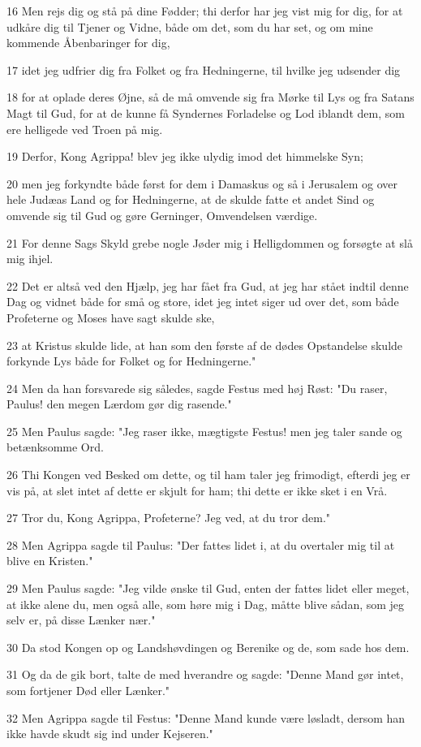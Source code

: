 \par 16 Men rejs dig og stå på dine Fødder; thi derfor har jeg vist mig for dig, for at udkåre dig til Tjener og Vidne, både om det, som du har set, og om mine kommende Åbenbaringer for dig,
\par 17 idet jeg udfrier dig fra Folket og fra Hedningerne, til hvilke jeg udsender dig
\par 18 for at oplade deres Øjne, så de må omvende sig fra Mørke til Lys og fra Satans Magt til Gud, for at de kunne få Syndernes Forladelse og Lod iblandt dem, som ere helligede ved Troen på mig.
\par 19 Derfor, Kong Agrippa! blev jeg ikke ulydig imod det himmelske Syn;
\par 20 men jeg forkyndte både først for dem i Damaskus og så i Jerusalem og over hele Judæas Land og for Hedningerne, at de skulde fatte et andet Sind og omvende sig til Gud og gøre Gerninger, Omvendelsen værdige.
\par 21 For denne Sags Skyld grebe nogle Jøder mig i Helligdommen og forsøgte at slå mig ihjel.
\par 22 Det er altså ved den Hjælp, jeg har fået fra Gud, at jeg har stået indtil denne Dag og vidnet både for små og store, idet jeg intet siger ud over det, som både Profeterne og Moses have sagt skulde ske,
\par 23 at Kristus skulde lide, at han som den første af de dødes Opstandelse skulde forkynde Lys både for Folket og for Hedningerne."
\par 24 Men da han forsvarede sig således, sagde Festus med høj Røst: "Du raser, Paulus! den megen Lærdom gør dig rasende."
\par 25 Men Paulus sagde: "Jeg raser ikke, mægtigste Festus! men jeg taler sande og betænksomme Ord.
\par 26 Thi Kongen ved Besked om dette, og til ham taler jeg frimodigt, efterdi jeg er vis på, at slet intet af dette er skjult for ham; thi dette er ikke sket i en Vrå.
\par 27 Tror du, Kong Agrippa, Profeterne? Jeg ved, at du tror dem."
\par 28 Men Agrippa sagde til Paulus: "Der fattes lidet i, at du overtaler mig til at blive en Kristen."
\par 29 Men Paulus sagde: "Jeg vilde ønske til Gud, enten der fattes lidet eller meget, at ikke alene du, men også alle, som høre mig i Dag, måtte blive sådan, som jeg selv er, på disse Lænker nær."
\par 30 Da stod Kongen op og Landshøvdingen og Berenike og de, som sade hos dem.
\par 31 Og da de gik bort, talte de med hverandre og sagde: "Denne Mand gør intet, som fortjener Død eller Lænker."
\par 32 Men Agrippa sagde til Festus: "Denne Mand kunde være løsladt, dersom han ikke havde skudt sig ind under Kejseren."

